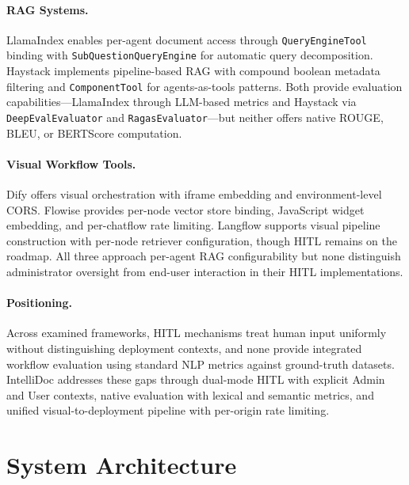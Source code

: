 \documentclass[11pt]{article}
\begin{document}
\paragraph{RAG Systems.}
LlamaIndex \citep{liu2022llamaindex} enables per-agent document access through \texttt{QueryEngineTool} binding with \texttt{SubQuestionQueryEngine} for automatic query decomposition. Haystack \citep{haystack2024} implements pipeline-based RAG with compound boolean metadata filtering and \texttt{ComponentTool} for agents-as-tools patterns. Both provide evaluation capabilities---LlamaIndex through LLM-based metrics and Haystack via \texttt{DeepEvalEvaluator} and \texttt{RagasEvaluator}---but neither offers native ROUGE, BLEU, or BERTScore computation.

\paragraph{Visual Workflow Tools.}
Dify \citep{dify2024} offers visual orchestration with iframe embedding and environment-level CORS. Flowise \citep{flowise2024} provides per-node vector store binding, JavaScript widget embedding, and per-chatflow rate limiting. Langflow \citep{langflow2024} supports visual pipeline construction with per-node retriever configuration, though HITL remains on the roadmap. All three approach per-agent RAG configurability but none distinguish administrator oversight from end-user interaction in their HITL implementations.

\paragraph{Positioning.}
Across examined frameworks, HITL mechanisms treat human input uniformly without distinguishing deployment contexts, and none provide integrated workflow evaluation using standard NLP metrics against ground-truth datasets. IntelliDoc addresses these gaps through dual-mode HITL with explicit Admin and User contexts, native evaluation with lexical and semantic metrics, and unified visual-to-deployment pipeline with per-origin rate limiting.









\section{System Architecture}
\label{sec:architecture}
\end{document}
